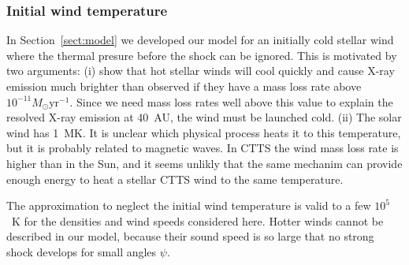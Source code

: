 \subsubsection{Initial wind temperature}
\label{sect:T_0}
In Section~\ref{sect:model} we developed our model for an initially cold stellar wind where the thermal presure before the shock can be ignored. This is motivated by two arguments: (i) \citet{2007IAUS..243..299M} show that hot stellar winds will cool quickly and cause X-ray emission much brighter than observed if they have a mass loss rate above $10^{-11}M_\odot\mathrm{ yr}^{-1}$. Since we need mass loss rates well above this value to explain the resolved X-ray emission at 40~AU, the wind must be launched cold. (ii) The solar wind has 1~MK. It is unclear which physical process heats it to this temperature, but it is probably related to magnetic waves. In CTTS the wind mass loss rate is higher than in the Sun, and it seems unlikly that the same mechanim can provide enough energy to heat a stellar CTTS wind to the same temperature.

The approximation to neglect the initial wind temperature is valid to a few $10^5$~K for the densities and wind speeds considered here. Hotter winds cannot be described in our model, because their sound speed is so large that no strong shock develops for small angles $\psi$.